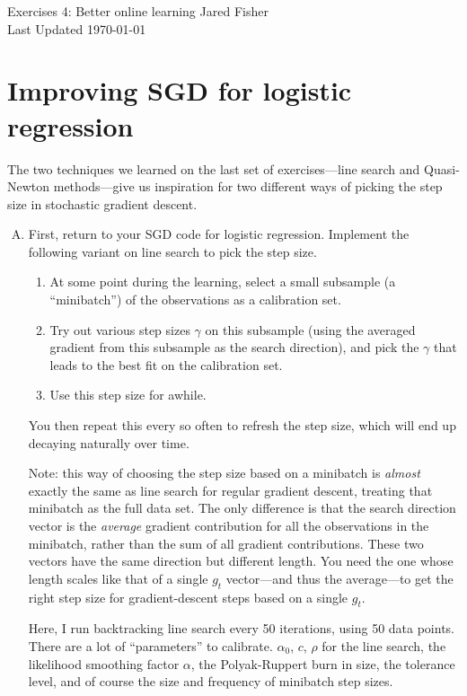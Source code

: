 \documentclass{article}
\begin{document}
\large 
\begin{center}
Exercises 4: Better online learning
\vspace{10pt}
Jared Fisher\\
Last Updated \today
\end{center}
\normalsize


\section{Improving SGD for logistic regression}

The two techniques we learned on the last set of exercises---line search and Quasi-Newton methods---give us inspiration for two different ways of picking the step size in stochastic gradient descent.

\begin{enumerate}[(A)]

\item First, return to your SGD code for logistic regression.  Implement the following variant on line search to pick the step size.
\begin{enumerate}[1.]
\item At some point during the learning, select a small subsample (a ``minibatch'') of the observations as a calibration set.
\item Try out various step sizes $\gamma$ on this subsample (using the averaged gradient from this subsample as the search direction), and pick the $\gamma$ that leads to the best fit on the calibration set.
\item Use this step size for awhile.
\end{enumerate}
You then repeat this every so often to refresh the step size, which will end up decaying naturally over time.

Note: this way of choosing the step size based on a minibatch is \textit{almost} exactly the same as line search for regular gradient descent, treating that minibatch as the full data set.  The only difference is that the search direction vector is the \textit{average} gradient contribution for all the observations in the minibatch, rather than the sum of all gradient contributions.  These two vectors have the same direction but different length.  You need the one whose length scales like that of a single $g_t$ vector---and thus the average---to get the right step size for gradient-descent steps based on a single $g_t$.

\color{blue}
Here, I run backtracking line search every 50 iterations, using 50 data points. There are a lot of ``parameters'' to calibrate. $\alpha_0$, $c$, $\rho$ for the line search, the likelihood smoothing factor $\alpha$, the Polyak-Ruppert burn in size, the tolerance level, and of course the size and frequency of minibatch step sizes. 


\end{enumerate}
\end{document}
